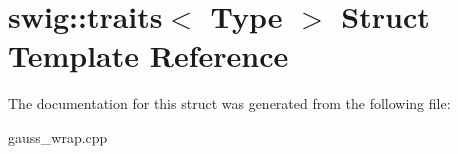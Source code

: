 \hypertarget{structswig_1_1traits}{\section{swig\-:\-:traits$<$ Type $>$ Struct Template Reference}
\label{structswig_1_1traits}
}


The documentation for this struct was generated from the following file\-:\begin{DoxyCompactItemize}
\item 
gauss\-\_\-wrap.\-cpp\end{DoxyCompactItemize}
